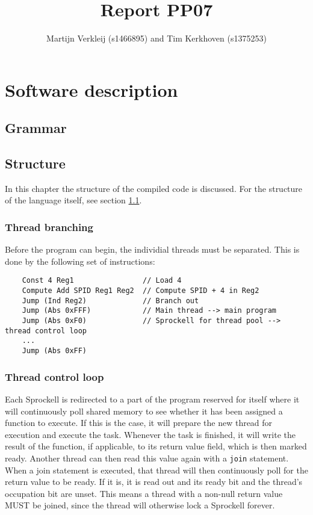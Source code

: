 \documentclass[10pt,a4paper]{report}
\author{Martijn Verkleij (s1466895) and Tim Kerkhoven (s1375253)}
\title{Report PP07}
\begin{document}
\maketitle
\tableofcontents



\chapter{Software description}

\section{Grammar} \label{sec:grammar}

\section{Structure} \label{sec:structure}
In this chapter the structure of the compiled code is discussed. For the structure of the language itself, see section \ref{sec:grammar}. 
\subsection{Thread branching}
Before the program can begin, the individial threads must be separated. This is done by the following set of instructions:
\begin{verbatim}
	Const 4 Reg1				// Load 4
	Compute Add SPID Reg1 Reg2	// Compute SPID + 4 in Reg2
	Jump (Ind Reg2)				// Branch out
	Jump (Abs 0xFFF)			// Main thread --> main program
	Jump (Abs 0xF0)				// Sprockell for thread pool --> thread control loop
	...
	Jump (Abs 0xFF)
\end{verbatim}

\subsection{Thread control loop}
Each Sprockell is redirected to a part of the program reserved for itself where it will continuously poll shared memory to see whether it has been assigned a function to execute. If this is the case, it will prepare the new thread for execution and execute the task. Whenever the task is finished, it will write the result of the function, if applicable, to its return value field, which is then marked ready. Another thread can then read this value again with a \texttt{join} statement. When a join statement is executed, that thread will then continuously poll for the return value to be ready. If it is, it is read out and its ready bit and the thread's occupation bit are unset. This means a thread with a non-null return value MUST be joined, since the thread will otherwise lock a Sprockell forever. 
\end{document}
